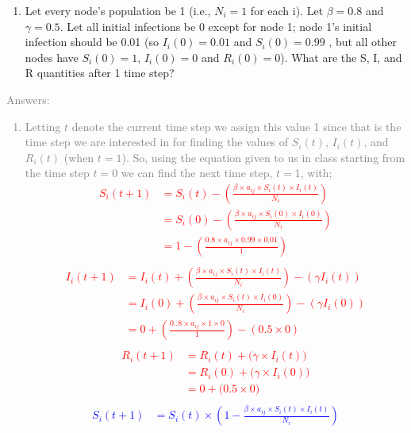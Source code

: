 \documentclass[11pt]{article}
\begin{document}
\begin{enumerate}
	\item Let every node's population be 1 (i.e., $N_i = 1$  for each i). Let  $\beta = 0.8$ and $\gamma = 0.5$. Let all initial infections be 0 except for node 1; node 1's initial infection should be 0.01 (so  $I_i(0)=0.01$ and $S_i(0)=0.99$ , but all other nodes have $S_i(0)=1$,  $I_i(0) = 0$ and $R_i(0) = 0$). What are the S, I, and R quantities after 1 time step?
\end{enumerate}
\textcolor{gray}{
Answers:
\begin{enumerate}
		\item Letting $t$ denote the current time step we assign this value 1 since that is the time step we are interested in for finding the values of $S_i(t)$, $I_i(t)$, and $R_i(t)$ (when $t=1$).  So, using the equation given to us in class starting from the time step $t=0$ we can find the next time step, $t=1$, with;\\
\textcolor{red}{
\begin{align*}
S_i(t+1) 	&=  S_i(t) - \left(\frac{\beta \times a_{ij} \times S_i(t) \times I_i(t)}{N_i}\right)\\
		&=	S_i(0) - \left(\frac{\beta \times a_{ij} \times S_i(0) \times I_i(0)}{N_i}\right)\\
		&=	1  -\left(\frac{0.8 \times a_{ij} \times 0.99 \times 0.01}{1}\right)\\
\end{align*}
\begin{align*}
I_i(t+1) 	&=  I_i(t) + \left(\frac{\beta \times a_{ij} \times S_i(t) \times I_i(t)}{N_i}\right) - (\gamma I_i(t))\\
		&=	I_i(0) + \left(\frac{\beta \times a_{ij} \times S_i(t) \times I_i(0)}{N_i}\right) - (\gamma I_i(0))\\
		&=	0 + \left(\frac{0..8 \times a_{ij} \times 1 \times 0}{1}\right) - (0.5 \times 0)\\
\end{align*}
\begin{align*}
R_i(t+1) 	&=  R_i(t) + \big(\gamma \times I_i(t)\big)\\
		&=  R_i(0) + \big(\gamma \times I_i(0)\big)\\
		&=  0 + \big(0.5 \times 0 \big)\\
\end{align*}
}
\textcolor{blue}{
\begin{align*}
S_i(t+1) 	&=  S_i(t) \times \left( 1 - \frac{\beta \times a_{ij} \times S_i(t) \times I_i(t)}{N_i}\right)\\

\end{align*}}
\end{enumerate}}
\end{document}
